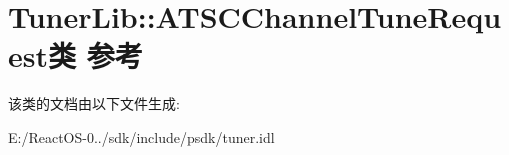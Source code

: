 \hypertarget{class_tuner_lib_1_1_a_t_s_c_channel_tune_request}{}\section{Tuner\+Lib\+:\+:A\+T\+S\+C\+Channel\+Tune\+Request类 参考}
\label{class_tuner_lib_1_1_a_t_s_c_channel_tune_request}


该类的文档由以下文件生成\+:\begin{DoxyCompactItemize}
\item 
E\+:/\+React\+O\+S-\/0../sdk/include/psdk/tuner.\+idl\end{DoxyCompactItemize}
